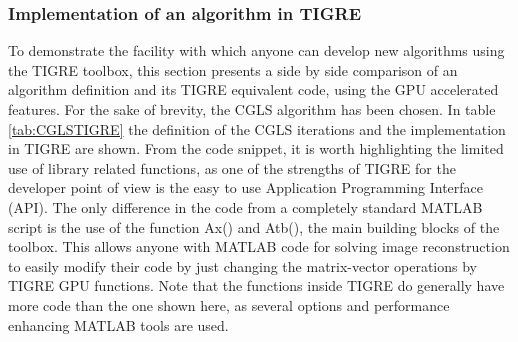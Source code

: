 \subsubsection{Implementation of an algorithm in TIGRE}
To demonstrate the facility with which anyone can develop new algorithms using the
TIGRE toolbox, this section presents a side by side comparison of an algorithm definition and its TIGRE equivalent code, using the GPU accelerated features. For the
sake of brevity, the CGLS algorithm has been chosen.
In table \ref{tab:CGLSTIGRE} the definition of the CGLS iterations and the implementation in TIGRE
are shown. From the code snippet, it is worth highlighting the limited use of library related
functions, as one of the strengths of TIGRE for the developer point of view is the
easy to use Application Programming Interface (API). The only difference in the code
from a completely standard MATLAB script is the use of the function Ax() and Atb(),
the main building blocks of the toolbox. This allows anyone
with MATLAB code for solving image reconstruction to easily modify their code by just
changing the matrix-vector operations by TIGRE GPU functions. Note that the functions inside TIGRE do generally have more code than the one shown here, as several options and performance enhancing MATLAB tools are used.

\pagebreak


